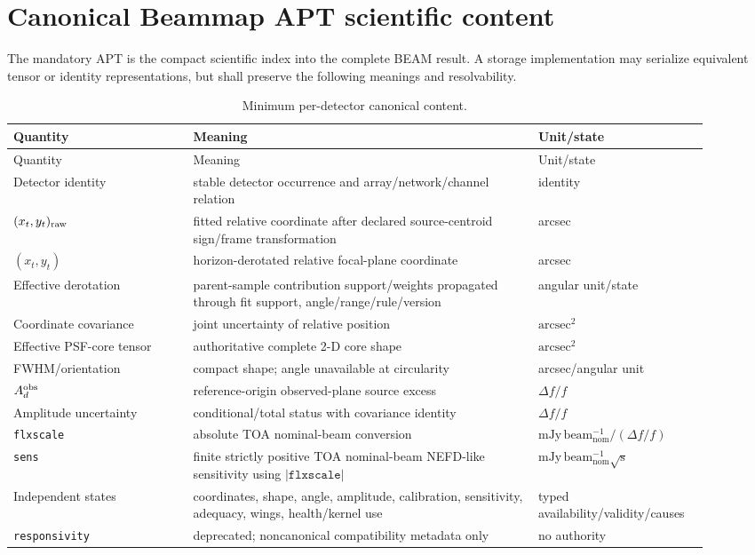 \documentclass[10pt]{article}
\begin{document}
\section{Canonical Beammap APT scientific content}

The mandatory APT is the compact scientific index into the complete BEAM
result. A storage implementation may serialize equivalent tensor or identity
representations, but shall preserve the following meanings and resolvability.

\begin{longtable}{L{0.24\linewidth}L{0.46\linewidth}L{0.21\linewidth}}
\caption{Minimum per-detector canonical content.}\label{tab:apt-row}\\
\toprule Quantity & Meaning & Unit/state \\
\midrule
\endfirsthead
\toprule Quantity & Meaning & Unit/state \\
\midrule
\endhead
Detector identity & stable detector occurrence and array/network/channel relation & identity \\
$(x_t,y_t)_{\rm raw}$ & fitted relative coordinate after declared source-centroid sign/frame transformation & arcsec \\
$(x_t,y_t)$ & horizon-derotated relative focal-plane coordinate & arcsec \\
Effective derotation & parent-sample contribution support/weights propagated through fit support, angle/range/rule/version & angular unit/state \\
Coordinate covariance & joint uncertainty of relative position & $\mathrm{arcsec^2}$ \\
Effective PSF-core tensor & authoritative complete 2-D core shape & $\mathrm{arcsec^2}$ \\
FWHM/orientation & compact shape; angle unavailable at circularity & arcsec/angular unit \\
$A_d^{\rm obs}$ & reference-origin observed-plane source excess & $\Delta f/f$ \\
Amplitude uncertainty & conditional/total status with covariance identity & $\Delta f/f$ \\
\texttt{flxscale} & absolute TOA nominal-beam conversion & $\mathrm{mJy\,beam_{nom}^{-1}}/(\Delta f/f)$ \\
\texttt{sens} & finite strictly positive TOA nominal-beam NEFD-like sensitivity using $|\texttt{flxscale}|$ & $\mathrm{mJy\,beam_{nom}^{-1}\sqrt{s}}$ \\
Independent states & coordinates, shape, angle, amplitude, calibration, sensitivity, adequacy, wings, health/kernel use & typed availability/validity/causes \\
\texttt{responsivity} & deprecated; noncanonical compatibility metadata only & no authority \\
\bottomrule
\end{longtable}
\end{document}
